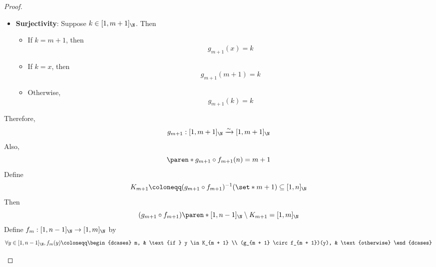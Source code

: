 \begin{proof}
\begin{enumerate}[label=\textbf{(\Alph*)}]
\begin{itemize}
\begin{itemize}
\begin{itemize}
\[\begin{array}{c}
                                      g_{m + 1}(y_{2}) = y_{2}                                         \\
                                      \Downarrow                                                       \\
                                      y_{2} = y_{1}
                                    \end{array}
                                  \]
                          \end{itemize}
                    \item \textbf{Surjectivity}: Suppose $k \in [1, m + 1]_{\N}$. Then
                          \begin{itemize}
                            \item If $k = m + 1$, then
                                  \[
                                    g_{m + 1}(x) = k
                                  \]
                            \item If $k = x$, then
                                  \[
                                    g_{m + 1}(m + 1) = k
                                  \]
                            \item Otherwise,
                                  \[
                                    g_{m + 1}(k) = k
                                  \]
                          \end{itemize}
                  \end{itemize}
                  Therefore,
                  \[
                    g_{m + 1}: [1, m + 1]_{\N} \xrightarrow{\sim} [1, m + 1]_{\N}
                  \]
                  Also,
                  \[
                    \paren*{g_{m + 1} \circ f_{m + 1}}(n) = m + 1
                  \]
                  Define
                  \[
                    K_{m + 1} \coloneqq (g_{m + 1} \circ f_{m + 1})^{-1}(\set*{m + 1}) \subseteq [1, n]_{\N}
                  \]
                  Then
                  \[
                    (g_{m + 1} \circ f_{m + 1})\paren*{[1, n - 1]_{\N} \setminus K_{m + 1}} = [1, m]_{\N}
                  \]
                  Define $f_{m}: [1, n - 1]_{\N} \to [1, m]_{\N}$ by
                  \[
                    \forall y \in [1, n - 1]_{\N}, f_{m}(y) \coloneqq \begin{dcases}
                      m,                              & \text{if } y \in K_{m + 1} \\
                      (g_{m + 1} \circ f_{m + 1})(y), & \text{otherwise}

\end{dcases}\]
\end{itemize}
\end{enumerate}
\end{proof}
